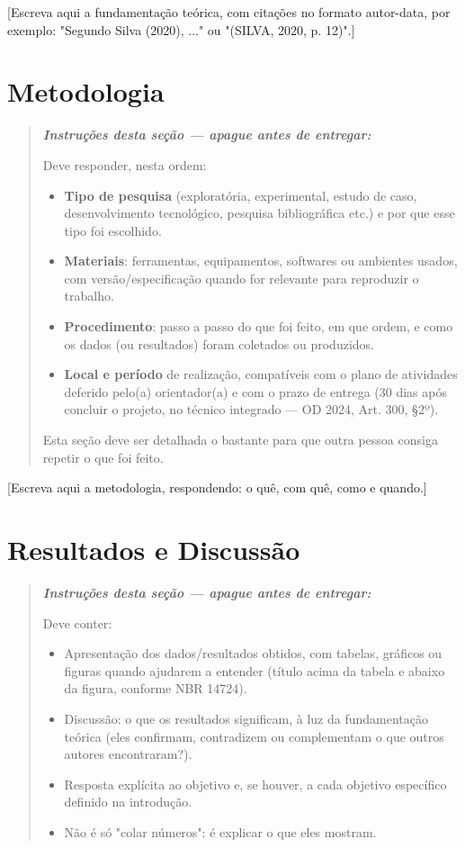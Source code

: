 \documentclass[article,12pt,a4paper]{abntex2}
\newenvironment{instrucoes}{%
  \begin{quotation}\footnotesize\itshape
  \noindent\textbf{\upshape Instruções desta seção — apague antes de entregar:}\par\smallskip
}{%
  \end{quotation}
}
\begin{document}
[Escreva aqui a fundamentação teórica, com citações no formato autor-data, por
exemplo: "Segundo Silva (2020), ..." ou "(SILVA, 2020, p. 12)".]

\section{Metodologia}

\begin{instrucoes}
Deve responder, nesta ordem:
\begin{itemize}
  \item \textbf{Tipo de pesquisa} (exploratória, experimental, estudo de caso, desenvolvimento tecnológico, pesquisa bibliográfica etc.) e por que esse tipo foi escolhido.
  \item \textbf{Materiais}: ferramentas, equipamentos, softwares ou ambientes usados, com versão/especificação quando for relevante para reproduzir o trabalho.
  \item \textbf{Procedimento}: passo a passo do que foi feito, em que ordem, e como os dados (ou resultados) foram coletados ou produzidos.
  \item \textbf{Local e período} de realização, compatíveis com o plano de atividades deferido pelo(a) orientador(a) e com o prazo de entrega (30 dias após concluir o projeto, no técnico integrado — OD 2024, Art. 300, §2º).
\end{itemize}
Esta seção deve ser detalhada o bastante para que outra pessoa consiga repetir o que foi feito.
\end{instrucoes}

[Escreva aqui a metodologia, respondendo: o quê, com quê, como e quando.]

\section{Resultados e Discussão}

\begin{instrucoes}
Deve conter:
\begin{itemize}
  \item Apresentação dos dados/resultados obtidos, com tabelas, gráficos ou figuras quando ajudarem a entender (título acima da tabela e abaixo da figura, conforme NBR 14724).
  \item Discussão: o que os resultados significam, à luz da fundamentação teórica (eles confirmam, contradizem ou complementam o que outros autores encontraram?).
  \item Resposta explícita ao objetivo e, se houver, a cada objetivo específico definido na introdução.
  \item Não é só "colar números": é explicar o que eles mostram.
\end{itemize}
\end{instrucoes}
\end{document}

